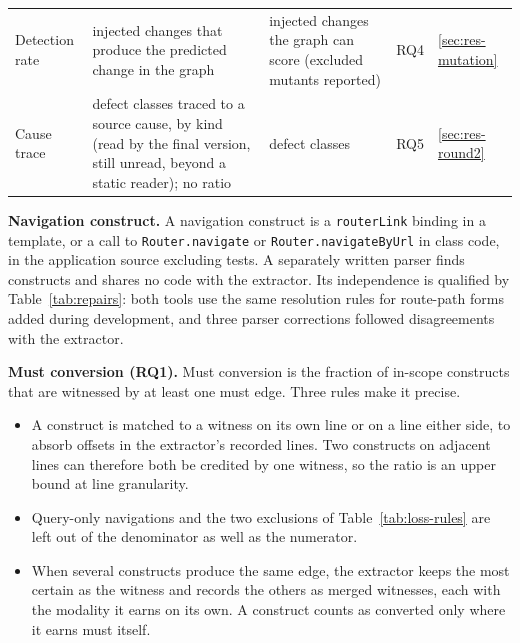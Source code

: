 \begin{table}[tp]
\begin{tabularx}{\textwidth}{@{}>{\raggedright\arraybackslash}p{2.4cm}YY>{\raggedright\arraybackslash}p{0.9cm}>{\raggedright\arraybackslash}p{2.0cm}@{}}
Detection rate & injected changes that produce the predicted change in the graph & injected changes the graph can score (excluded mutants reported) & RQ4 & \ref{sec:res-mutation} \\
Cause trace & defect classes traced to a source cause, by kind (read by the final version, still unread, beyond a static reader); no ratio & defect classes & RQ5 & \ref{sec:res-round2} \\
\bottomrule
\end{tabularx}
\par{}
\end{table}

\textbf{Navigation construct.} A navigation construct is a \texttt{routerLink} binding in a
template, or a call to \texttt{Router.navigate} or \texttt{Router.navigateByUrl} in class code,
in the application source excluding tests. A separately written parser finds constructs and shares
no code with the extractor. Its independence is qualified by Table~\ref{tab:repairs}: both
tools use the same resolution rules for route-path forms added during development, and three parser
corrections followed disagreements with the extractor.

\textbf{Must conversion (RQ1).} Must conversion is the fraction of in-scope constructs that are
witnessed by at least one must edge. Three rules make it precise.
\begin{itemize}
\item A construct is matched to a witness on its own line or on a line either side, to absorb
offsets in the extractor's recorded lines. Two constructs on adjacent lines can therefore both be
credited by one witness, so the ratio is an upper bound at line granularity.
\item Query-only navigations and the two exclusions of Table~\ref{tab:loss-rules} are left out of
the denominator as well as the numerator.
\item When several constructs produce the same edge, the extractor keeps the most certain as the
witness and records the others as merged witnesses, each with the modality it earns on its own. A
construct counts as converted only where it earns must itself.
\end{itemize}

